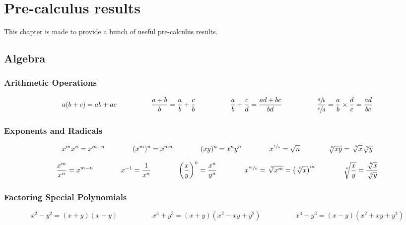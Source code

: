 \chapter{Pre-calculus results}

This chapter is made to provide a bunch of useful pre-calculus results.

\section{Algebra}
\subsection{Arithmetic Operations}

\[
  a(b + c) = ab + ac \hspace{5em}
  \frac{a + b}b = \frac ab + \frac cb \hspace{5em}
  \frac ab + \frac cd = \frac{ad + bc}{bd} \hspace{5em}
  \frac{\sfrac ab}{\sfrac cd} = \frac ab \times \frac dc = \frac{ad}{bc}
\]

\subsection{Exponents and Radicals}

\[
  x^m x^n = x^{m + n}\hspace{4em}
  (x^m)^n = x^{mn} \hspace{4em}
  (xy)^n = x^n y^n \hspace{4em}
  x^{\sfrac 1n} = \sqrt n \hspace{4em}
  \nthroot n{xy} = \nthroot nx \nthroot ny
\]

\[
  \frac{x^m}{x^n} = x^{m - n} \hspace{4em}
  x^{-1} = \frac 1{x^n} \hspace{4em}
  \parens*{\frac xy}^n = \frac{x^n}{y^n} \hspace{4em}
  x^{\sfrac mn} = \nthroot n{x^m} = \parens*{\nthroot nx}^m \hspace{4em}
  \nthroot n{\frac xy} = \frac{\nthroot nx}{\nthroot xy}
\]

\subsection{Factoring Special Polynomials}
\[
  x^2 - y^2 = (x + y) (x - y) \hspace{5em}
  x^3 + y^3 = (x + y) (x^2 - xy + y^2) \hspace{5em}
  x^3 - y^3 = (x - y) (x^2 + xy + y^2)
\]
